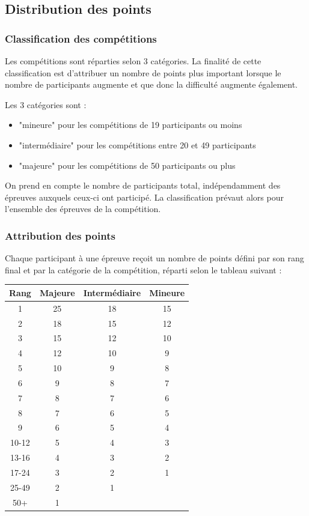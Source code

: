 \documentclass[10pt,a4paper]{article}
\newcommand{\3}{$3\times3$}
\newcommand{\4}{$4\times4$}
\newcommand{\2}{$2\times2$}
\begin{document}
\subsection{Distribution des points}
\subsubsection{Classification des compétitions}

Les compétitions sont réparties selon 3 catégories. La finalité de cette classification est d'attribuer un nombre de points plus important lorsque le nombre de participants augmente et que donc la difficulté augmente également.

Les 3 catégories sont : 
\begin{itemize}
\item "mineure" pour les compétitions de 19 participants ou moins
\item "intermédiaire" pour les compétitions entre 20 et 49 participants
\item "majeure" pour les compétitions de 50 participants ou plus
\end{itemize}

On prend en compte le nombre de participants total, indépendamment des épreuves auxquels ceux-ci ont participé. La classification prévaut alors pour l'ensemble des épreuves de la compétition.

\subsubsection{Attribution des points}

Chaque participant à une épreuve reçoit un nombre de points défini par son rang final et par la catégorie de la compétition, réparti selon le tableau suivant :

\begin{table}[h]
\begin{center}
\begin{tabular}{|c|c|c|c|}
\hline
Rang & Majeure & Intermédiaire & Mineure \\
\hline
1 & 25 & 18 & 15 \\
2 & 18 & 15 & 12 \\
3 & 15 & 12 & 10 \\
4 & 12 & 10 & 9  \\
5 & 10 & 9  & 8  \\
6 & 9  & 8  & 7  \\
7 & 8  & 7  & 6  \\
8 & 7  & 6  & 5  \\
9 & 6  & 5  & 4  \\
10-12 & 5  & 4  & 3  \\
13-16 & 4  & 3  & 2  \\
17-24 & 3  & 2  & 1  \\
25-49 & 2  & 1  &    \\
50+   & 1  &    &    \\
\hline
\end{tabular}
\end{center}
\end{table}
\end{document}
